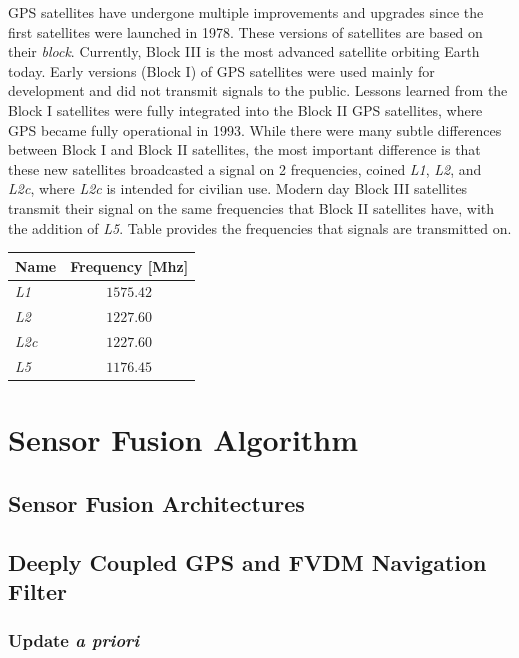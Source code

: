 \documentclass[12pt]{report}
\begin{document}
GPS satellites have undergone multiple improvements and upgrades since the first satellites were launched in 1978. These versions of satellites are based on their \textit{block}. Currently, Block III is the most advanced satellite orbiting Earth today. Early versions (Block I) of GPS satellites were used mainly for development and did not transmit signals to the public. Lessons learned from the Block I satellites were fully integrated into the Block II GPS satellites, where GPS became fully operational in 1993. While there were many subtle differences between Block I and Block II satellites, the most important difference is that these new satellites broadcasted a signal on 2 frequencies, coined \textit{L1}, \textit{L2}, and \textit{L2c}, where \textit{L2c} is intended for civilian use. Modern day Block III satellites transmit their signal on the same frequencies that Block II satellites have, with the addition of \textit{L5}. Table provides the frequencies that signals are transmitted on.

\begin{table}[h!]\label{tbl:GPSfreq}
  \centering
  \begin{tabular}{lc}
    \toprule
    \textbf{Name} & \textbf{Frequency [Mhz]} \\
    \midrule
    \textit{L1}   & \(1575.42\)              \\
    \textit{L2}   & \(1227.60\)              \\
    \textit{L2c}  & \(1227.60\)              \\
    \textit{L5}   & \(1176.45\)              \\
    \bottomrule
  \end{tabular}
\end{table}


\chapter{Sensor Fusion Algorithm}
\section{Sensor Fusion Architectures}
\section{Deeply Coupled GPS and FVDM Navigation Filter}
\subsection{Update \textit{a priori}}
\end{document}
